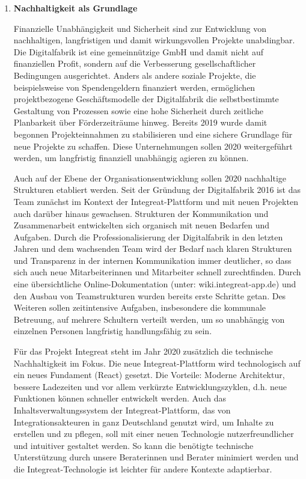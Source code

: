 \documentclass[12pt, a4paper]{article} %
\begin{document}
\begin{enumerate}
\def\labelenumi{\arabic{enumi}.}
\item \textbf{Nachhaltigkeit als Grundlage}

Finanzielle Unabhängigkeit und Sicherheit sind zur Entwicklung von
nachhaltigen, langfristigen und damit wirkungsvollen Projekte
unabdingbar. Die Digitalfabrik ist eine gemeinnützige GmbH und damit
nicht auf finanziellen Profit, sondern auf die Verbesserung
gesellschaftlicher Bedingungen ausgerichtet. Anders als andere soziale
Projekte, die beispielsweise von Spendengeldern finanziert werden,
ermöglichen projektbezogene Geschäftsmodelle der Digitalfabrik die
selbstbestimmte Gestaltung von Prozessen sowie eine hohe Sicherheit
durch zeitliche Planbarkeit über Förderzeiträume hinweg. Bereits 2019
wurde damit begonnen Projekteinnahmen zu stabilisieren und eine sichere
Grundlage für neue Projekte zu schaffen. Diese Unternehmungen sollen
2020 weitergeführt werden, um langfristig finanziell unabhängig agieren
zu können.

Auch auf der Ebene der Organisationsentwicklung sollen 2020 nachhaltige
Strukturen etabliert werden. Seit der Gründung der Digitalfabrik 2016
ist das Team zunächst im Kontext der Integreat-Plattform und mit neuen
Projekten auch darüber hinaus gewachsen. Strukturen der Kommunikation
und Zusammenarbeit entwickelten sich organisch mit neuen Bedarfen und
Aufgaben. Durch die Professionalisierung der Digitalfabrik in den
letzten Jahren und dem wachsenden Team wird der Bedarf nach klaren
Strukturen und Transparenz in der internen Kommunikation immer
deutlicher, so dass sich auch neue Mitarbeiterinnen und Mitarbeiter
schnell zurechtfinden. Durch eine übersichtliche Online-Dokumentation
(unter: wiki.integreat-app.de) und den Ausbau von Teamstrukturen wurden
bereits erste Schritte getan. Des Weiteren sollen zeitintensive
Aufgaben, insbesondere die kommunale Betreuung, auf mehrere Schultern
verteilt werden, um so unabhängig von einzelnen Personen langfristig
handlungsfähig zu sein.

Für das Projekt Integreat steht im Jahr 2020 zusätzlich die technische
Nachhaltigkeit im Fokus. Die neue Integreat-Plattform wird technologisch
auf ein neues Fundament (React) gesetzt. Die Vorteile: Moderne
Architektur, bessere Ladezeiten und vor allem verkürzte
Entwicklungszyklen, d.h. neue Funktionen können schneller entwickelt
werden. Auch das Inhaltsverwaltungssystem der Integreat-Plattform, das
von Integrationsakteuren in ganz Deutschland genutzt wird, um Inhalte zu
erstellen und zu pflegen, soll mit einer neuen Technologie
nutzerfreundlicher und intuitiver gestaltet werden. So kann die
benötigte technische Unterstützung durch unsere Beraterinnen und Berater
minimiert werden und die Integreat-Technologie ist leichter für andere
Kontexte adaptierbar.


\end{enumerate}
\end{document}
